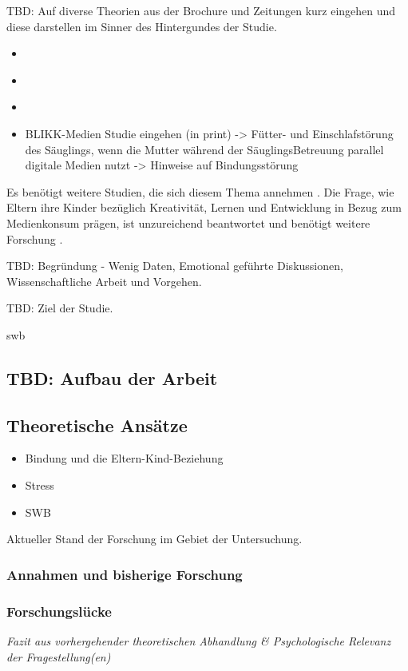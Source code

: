 TBD: Auf diverse Theorien aus der Brochure und Zeitungen kurz eingehen und diese darstellen im Sinner des Hintergundes der Studie.
    \begin{itemize}
        \item \cite{Weber2017}
        \item \cite{MariaLuisaNuesch2017}
        \item \cite{Elternbildung2017}
        \item BLIKK-Medien Studie eingehen (in print) -> Fütter- und Einschlafstörung des Säuglings, wenn die Mutter während der SäuglingsBetreuung parallel digitale Medien nutzt -> Hinweise auf Bindungsstörung
    \end{itemize}
    
Es benötigt weitere Studien, die sich diesem Thema annehmen \cite{Wartella2016}. Die Frage, wie Eltern ihre Kinder bezüglich Kreativität, Lernen und Entwicklung in Bezug zum Medienkonsum prägen, ist unzureichend beantwortet und benötigt weitere Forschung \cite{AmericanAcademyofPediatrics2011,Troseth2016}. 
    
TBD: Begründung - Wenig Daten, Emotional geführte Diskussionen, Wissenschaftliche Arbeit und Vorgehen.

TBD: Ziel der Studie.


\gls{swb}

\subsection{TBD: Aufbau der Arbeit}

\subsection{Theoretische Ansätze}
\begin{itemize}
 \item Bindung und die Eltern-Kind-Beziehung 
 \item Stress
 \item SWB
\end{itemize}
Aktueller Stand der Forschung im Gebiet der Untersuchung.

\subsubsection{Annahmen und bisherige Forschung}
\subsubsection{Forschungslücke}
\textit{Fazit aus vorhergehender theoretischen Abhandlung \& Psychologische Relevanz der Fragestellung(en)}


